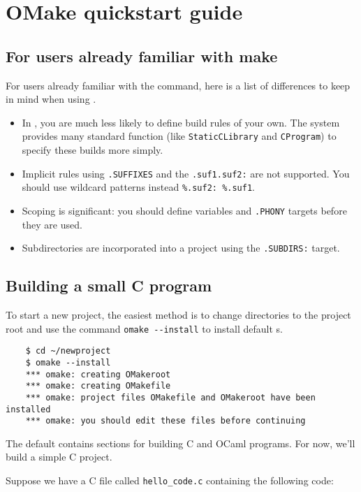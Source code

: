 %
%
\section{OMake quickstart guide}

\subsection{For users already familiar with make}

For users already familiar with the  command, here is a list of
differences to keep in mind when using .

\begin{itemize}
\item In , you are much less likely to define build rules of your own.
  The system provides many standard function (like \verb+StaticCLibrary+ and \verb+CProgram+)
  to specify these builds more simply.
\item Implicit rules using \verb+.SUFFIXES+ and the \verb+.suf1.suf2:+ are not supported.
  You should use wildcard patterns instead \verb+%.suf2: %.suf1+.
\item Scoping is significant: you should define variables and \verb+.PHONY+ targets before they are used.
\item Subdirectories are incorporated into a project using the \verb+.SUBDIRS:+
  target.
\end{itemize}

\subsection{Building a small C program}

To start a new project, the easiest method is to change directories to the project
root and use the command \verb+omake --install+ to install default s.

\begin{verbatim}
    $ cd ~/newproject
    $ omake --install
    *** omake: creating OMakeroot
    *** omake: creating OMakefile
    *** omake: project files OMakefile and OMakeroot have been installed
    *** omake: you should edit these files before continuing
\end{verbatim}

The default  contains sections for building C and OCaml programs.
For now, we'll build a simple C project.

Suppose we have a C file called \verb+hello_code.c+ containing the following code:

